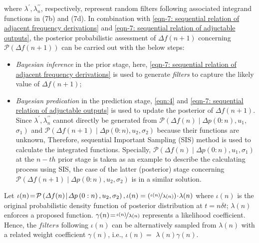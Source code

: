 \documentclass[lettersize,journal]{IEEEtran}
\begin{document}
\noindent where $\lambda^{\prime}, \lambda_{n}^{\prime \prime}$, respectively, represent random filters following associated integrand functions in (7b) and (7d). In combination with \eqref{eqn-7: sequential relation of adjacent frequency derivations} and \eqref{eqn-7: sequential relation of adjuctable outputs}, the posterior probabilistic assessment of $\varDelta f(n+1)$ concerning $\mathcal{P}(\varDelta f(n+1))$ can be carried out with the below steps:
\begin{itemize}
	\item[$\,\,i)$ ] \textit{Bayesian inference} in the prior stage, here, \eqref{eqn-7: sequential relation of adjacent frequency derivations} is used to generate \textit{filters} to capture the likely value of $\varDelta f(n+1)$;
	\item[$ii)$] \textit{Bayesian predication} in the prediction stage, \eqref{eqn:4} and \eqref{eqn-7: sequential relation of adjuctable outputs} is used to update the posterior of $\varDelta f(n+1)$. Since $\lambda^{\prime}, \lambda_{n}^{\prime \prime}$ cannot directly be generated from $\mathcal{P}\left(\varDelta f(n) \!\mid\! \varDelta p\left(0\!:\! n\right), u_{1},\right.$ $\left. \sigma_{1}\right)$ and $\mathcal{P}\left(\varDelta f(n\!+\!1) \!\mid\! \varDelta p\left(0\!:\!\right.\right.\left.n), u_{2}, \sigma_{2}\right)$ because their functions are unknown, Therefore, sequential Important Sampling (SIS) method is used to calculate the integrated functions. Specially, $\mathcal{P}(\varDelta f(n) \!\!\mid\!\! \varDelta p(0\!:\! n), \!u_{1},\!\sigma_{1})$ at the $n\!-\!th$ prior stage is taken as an example to describe the calculating process using SIS, the case of the latter (posterior) stage concerning $\mathcal{P}\left(\varDelta f(n+1) \!\mid\! \varDelta p\left(0: n\right), u_{2}, \sigma_{2}\right)$ is in a similar solution.
\end{itemize}

Let $\iota(n)\!=\!\mathcal{P}\left(\varDelta f(n) \!\mid\! \varDelta p\left({0}: n\right), u_{2}, \sigma_{2}\right), \iota(n)=(\nicefrac{\iota(n)}{ \lambda(n)}) \!\cdot\! \lambda(n)$ where $\iota(n)$ is the original probabilistic density function of posterior distribution at $t\!\! = \!\!n \delta t$; $\lambda(n)$ enforces a proposed function. $\gamma(n) \!=\! \nicefrac{\iota(n)}{\lambda(n)}$ represents a likelihood coefficient. Hence, the \!$filters$\! following $\iota(n)$ can be alternatively sampled from $\lambda(n)$ with a related weight coefficient $\gamma(n)$, i.e., $\iota(n) = $ $\lambda (n)\gamma(n)$.
\end{document}
